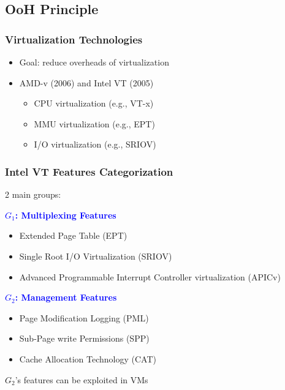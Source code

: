 \documentclass[xcolor=table,bigger,unknownkeysallowed]{beamer}
\begin{document}
\subsection{OoH Principle}
\begin{frame}
	\frametitle{Virtualization Technologies}
	\begin{itemize}
		\item Goal: reduce overheads of virtualization
		\item AMD-v (2006) and Intel VT (2005)
		\begin{itemize}
			\item CPU virtualization (e.g., VT-x)
			\item MMU virtualization (e.g., EPT)
			\item I/O virtualization (e.g., SRIOV)
		\end{itemize}
	\end{itemize}	
\end{frame}
\begin{frame}
	\frametitle{Intel VT Features Categorization}
	2 main groups:
	\begin{block}{\textcolor{blue}{\bf $G_1$: Multiplexing Features}}
		\begin{itemize}
			\item Extended Page Table (EPT)
			\item Single Root I/O Virtualization (SRIOV)
			\item Advanced Programmable Interrupt Controller virtualization (APICv)
		\end{itemize}
	\end{block}
	\pause
	\begin{block}{\textcolor{blue}{\bf $G_2$: Management Features}}
		\begin{itemize}
			\item Page Modification Logging (PML)
			\item Sub-Page write Permissions (SPP)
			\item Cache Allocation Technology (CAT)
		\end{itemize}		
	\end{block}
	\pause
	$G_2$'s features can be exploited in VMs
\end{frame}
\end{document}
